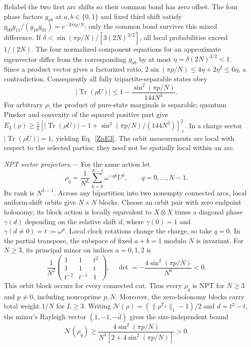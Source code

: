 \documentclass[aps,prl,reprint,nofootinbib]{revtex4-2}
\newcommand{\Tr}{\operatorname{Tr}}
\begin{document}
Relabel the two first arc shifts so their common bond has zero offset.
The four phase factors $g_{ab}$ at $a,b\in\{0,1\}$ and fixed third
shift satisfy $g_{00}g_{11}/(g_{10}g_{01})=e^{-2\pi ip/N}$: only the
common bond survives this mixed difference. If
$\delta<\sin(\pi p/N)/[3(2N)^{3/2}]$, all local probabilities exceed
$1/(2N)$. The four normalized component equations for an approximate
eigenvector differ from the corresponding $g_{ab}$ by at most
$\eta=\delta(2N)^{3/2}<1$. Since a product vector gives a factorized
ratio, $2\sin(\pi p/N)\le4\eta+2\eta^2\le6\eta$, a contradiction.
Consequently all fully tripartite-separable states obey
\begin{equation}
 |\Tr(\rho U)|\le1-\frac{\sin^2(\pi p/N)}{144N^3}.
 \label{ZnW}
\end{equation}
For arbitrary $\rho$, the product of pure-state marginals is separable;
quantum Pinsker and convexity of the squared positive part give
$E_3(\rho)\ge\frac14[|\Tr(\rho U)|-1+\sin^2(\pi p/N)/(144N^3)]_+^2$.
In a charge sector $|\Tr(\rho U)|=1$, yielding Eq.~\eqref{ZnE3}.
The orbit measurements are local with respect to the selected parties;
they need not be spatially local within an arc.

\emph{NPT sector projectors.---} For the same action let
\begin{equation}
 \rho_q=\frac1{N^L}\sum_{k=0}^{N-1}\omega^{-qk}U^k,
 \qquad q=0,\ldots,N-1.
 \label{sector}
\end{equation}
Its rank is $N^{L-1}$. Across any bipartition into two nonempty connected
arcs, local uniform-shift orbits give $N\times N$ blocks. Choose an orbit
pair with zero endpoint holonomy; its block action is locally equivalent
to $X\otimes X$ times a diagonal phase $\gamma(d)$ depending on the
relative shift $d$, where $\gamma(0)=1$ and $\gamma(d\ne0)=t:=\omega^p$.
Local clock rotations change the charge, so take $q=0$. In the partial
transpose, the subspace of fixed $a+b=1$ modulo $N$ is invariant. For
$N\ge3$, its principal minor on indices $a=0,1,2$ is
\begin{equation}
 \frac1{N^2}\begin{pmatrix}
 1&1&t^2\\ 1&1&t\\ t^{-2}&t^{-1}&1
 \end{pmatrix},\quad
 \det=-\frac{4\sin^2(\pi p/N)}{N^6}<0.
 \label{minor}
\end{equation}
This orbit block occurs for every connected cut. Thus every $\rho_q$ is
NPT for $N\ge3$ and $p\ne0$, including noncoprime $p,N$.
Moreover, the zero-holonomy blocks carry total weight $1/N$ for $L\ge3$.
Writing $\mathcal N(\rho)=(\|\rho^{T_A}\|_1-1)/2$ and $d=t^2-t$,
the minor's Rayleigh vector
$(1,-1,-\bar d)$ gives the size-independent bound
\begin{equation}
 \mathcal N(\rho_q)\ge
 \frac{4\sin^2(\pi p/N)}{N^3[2+4\sin^2(\pi p/N)]}>0.
 \label{Nlower}
\end{equation}
\end{document}
